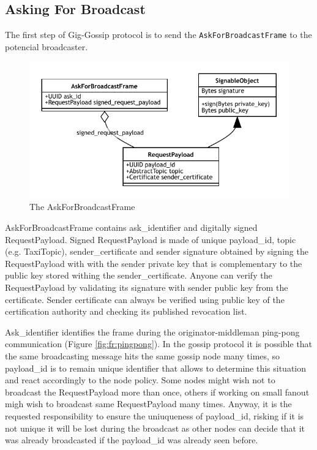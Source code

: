 \documentclass{article}
\begin{document}
\subsection{Asking For Broadcast}
The first step of Gig-Gossip protocol is to send the \texttt{AskForBroadcastFrame} to the potencial broadcaster.

\begin{figure}
	\centering
	\includegraphics[scale=1.0]{AskForBroadcast.pdf}
	\caption{The AskForBroadcastFrame}
	\label{fig:fr:askforbroadcast}
\end{figure}

AskForBroadcastFrame contains ask\_identifier and digitally signed RequestPayload. Signed RequestPayload is made of unique payload\_id, topic (e.g. TaxiTopic), sender\_certificate and sender signature obtained by signing the RequestPayload with with the sender private key that is complementary to the public key stored withing the sender\_certificate. Anyone can verify the RequestPayload by validating its signature with sender public key from the certificate. Sender certificate can always be verified using public key of the certification authority and checking its published revocation list.

Ask\_identifier identifies the frame during the originator-middleman ping-pong communication (Figure \ref{fig:fr:pingpong}). In the gossip protocol it is possible that the same broadcasting message hits the same gossip node many times, so payload\_id is to remain unique identifier that allows to determine this situation and react accordingly to the node policy. Some nodes might wish not to broadcast the RequestPayload more than once, others if working on small fanout migh wish to broadcast same RequestPayload many times. Anyway, it is the requested responsibility to ensure the uniuqueness of payload\_id, risking if it is not unique it will be lost during the broadcast as other nodes can decide that it was already broadcasted if the payload\_id was already seen before.
\end{document}
